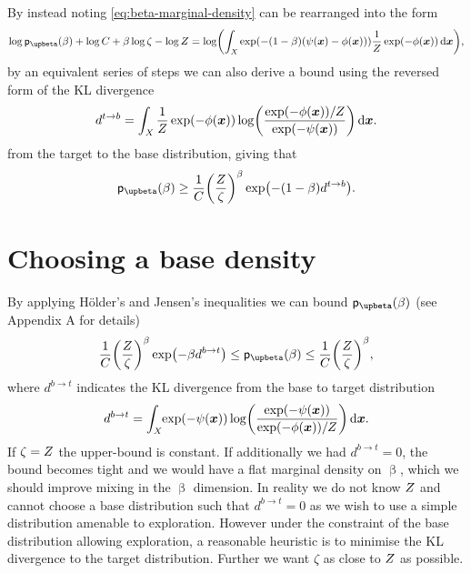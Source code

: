 By instead noting \eqref{eq:beta-marginal-density} can be rearranged into the form
\begin{equation}
  \log\pden{\upbeta}(\beta) + \log C + \beta\log\zeta - \log Z
  =
  \log\lpa
  \int_\set{X} 
    \exp\lpa-(1-\beta)\lpa\psi(\vct{x}) - \phi(\vct{x})\rpa\rpa \frac{1}{Z}\exp\lpa-\phi(\vct{x})\rpa
  \,\dr\vct{x}
  \rpa,
\end{equation}
by an equivalent series of steps we can also derive a bound using the reversed form of the \ac{KL} divergence 
\begin{equation}
  d^{t\to b} = \int_{\set{X}} 
    \frac{1}{Z}\exp\lpa -\phi(\vct{x})\rpa \log\lpa\frac{\exp\lpa -\phi(\vct{x})\rpa / Z}{\exp\lpa -\psi(\vct{x})\rpa}\rpa
  \,\dr\vct{x}.
\end{equation} 
from the target to the base distribution, giving that
\begin{equation}
  \pden{\upbeta}(\beta) \geq 
  \frac{1}{C} \lpa \frac{Z}{\zeta} \rpa^\beta \exp\lpa -(1 - \beta) d^{t\to b}\rpa.
\end{equation}

\section{Choosing a base density}\label{sec:choosing-base-density}

By applying H\"older's and Jensen's inequalities we can bound $\pden{\upbeta}(\beta)$ (see Appendix A for details)
\begin{equation}\label{eq:partition-function-bounds}
  \frac{1}{C}\lpa\frac{\normconst}{\zeta}\rpa^\beta \exp\lpa -\beta d^{b\to t}\rpa
  \leq \pden{\upbeta}(\beta) \leq
  \frac{1}{C}\lpa\frac{\normconst}{\zeta}\rpa^\beta,
\end{equation}
where $d^{b\to t}$ indicates the \ac{KL} divergence from the base to target distribution
\begin{equation}\label{eq:kl-base-to-target}
  d^{b\to t} = \int_{\set{X}}\kern-2pt 
    \exp\lpa -\psi(\vct{x})\rpa \log\lpa\frac{\exp\lpa -\psi(\vct{x})\rpa}{\exp\lpa -\phi(\vct{x})\rpa / \normconst}\rpa
  \,\dr\vct{x}.
\end{equation} 
If $\zeta = Z$ the upper-bound is constant. If additionally  we had $d^{b\to t} = 0$, the bound becomes tight and we would have a flat marginal density on $\upbeta$, which we should improve mixing in the $\upbeta$ dimension. In reality we do not know $Z$ and cannot choose a base distribution such that $d^{b\to t} = 0$ as we wish to use a simple distribution amenable to exploration. However under the constraint of the base distribution allowing exploration, a reasonable heuristic is to minimise the KL divergence to the target distribution. Further we want $\zeta$ as close to $Z$ as possible. 

